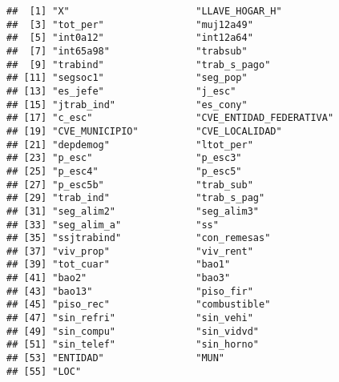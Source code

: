 \documentclass[11pt,]{article}
\newenvironment{Shaded}{\begin{snugshade}}{\end{snugshade}}
\newcommand{\KeywordTok}[1]{\textcolor[rgb]{0.13,0.29,0.53}{\textbf{#1}}}
\newcommand{\DecValTok}[1]{\textcolor[rgb]{0.00,0.00,0.81}{#1}}
\newcommand{\StringTok}[1]{\textcolor[rgb]{0.31,0.60,0.02}{#1}}
\newcommand{\OperatorTok}[1]{\textcolor[rgb]{0.81,0.36,0.00}{\textbf{#1}}}
\newcommand{\NormalTok}[1]{#1}
\begin{document}
\begin{Shaded}
\end{Shaded}

\begin{verbatim}
##  [1] "X"                      "LLAVE_HOGAR_H"         
##  [3] "tot_per"                "muj12a49"              
##  [5] "int0a12"                "int12a64"              
##  [7] "int65a98"               "trabsub"               
##  [9] "trabind"                "trab_s_pago"           
## [11] "segsoc1"                "seg_pop"               
## [13] "es_jefe"                "j_esc"                 
## [15] "jtrab_ind"              "es_cony"               
## [17] "c_esc"                  "CVE_ENTIDAD_FEDERATIVA"
## [19] "CVE_MUNICIPIO"          "CVE_LOCALIDAD"         
## [21] "depdemog"               "ltot_per"              
## [23] "p_esc"                  "p_esc3"                
## [25] "p_esc4"                 "p_esc5"                
## [27] "p_esc5b"                "trab_sub"              
## [29] "trab_ind"               "trab_s_pag"            
## [31] "seg_alim2"              "seg_alim3"             
## [33] "seg_alim_a"             "ss"                    
## [35] "ssjtrabind"             "con_remesas"           
## [37] "viv_prop"               "viv_rent"              
## [39] "tot_cuar"               "bao1"                  
## [41] "bao2"                   "bao3"                  
## [43] "bao13"                  "piso_fir"              
## [45] "piso_rec"               "combustible"           
## [47] "sin_refri"              "sin_vehi"              
## [49] "sin_compu"              "sin_vidvd"             
## [51] "sin_telef"              "sin_horno"             
## [53] "ENTIDAD"                "MUN"                   
## [55] "LOC"
\end{verbatim}
\end{document}

